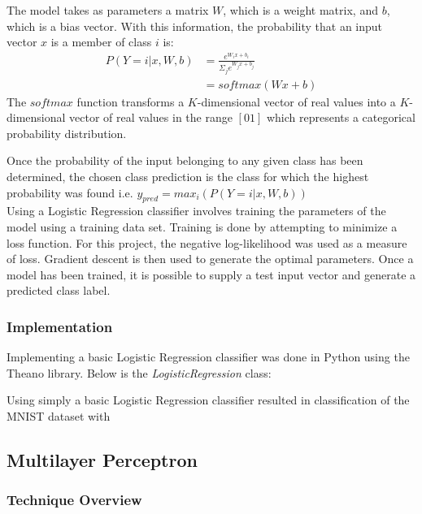 \documentclass[12pt, titlepage]{article}
\begin{document}
  The model takes as parameters a matrix $W$, which is a weight matrix, and $b$, which is a bias vector. With this information, the probability that an input vector 
  $x$ is a member of class $i$ is: \\
  \begin{align*}
  P(Y=i|x,W,b) &= \frac{e^{W_{i}x + b_{i}}}{\Sigma_{j}e^{W_{j}x + b_{j}}} \\
               &= softmax(Wx+b)
  \end{align*}
  The $softmax$ function transforms a $K$-dimensional vector of real values into a $K$-dimensional vector of real values in the range $[0 1]$ which represents a
  categorical probability distribution.
  
  Once the probability of the input belonging to any given class has been determined, the chosen class prediction is the class for which the highest probability
  was found i.e. $y_{pred} = max_{i}(P(Y=i|x,W,b))$ \\
  
  Using a Logistic Regression classifier involves training the parameters of the model using a training data set. Training is done by attempting to minimize a loss
  function. For this project, the negative log-likelihood was used as a measure of loss. Gradient descent is then used to generate the optimal parameters. Once a 
  model has been trained, it is possible to supply a test input vector and generate a predicted class label.
  
  \subsubsection{Implementation}
  
  Implementing a basic Logistic Regression classifier was done in Python using the Theano library. Below is the 
  \textit{LogisticRegression} class:
  
  
  Using simply a basic Logistic Regression classifier resulted in classification of the MNIST dataset with  

\subsection{Multilayer Perceptron}
  \subsubsection{Technique Overview}
  
\end{document}
